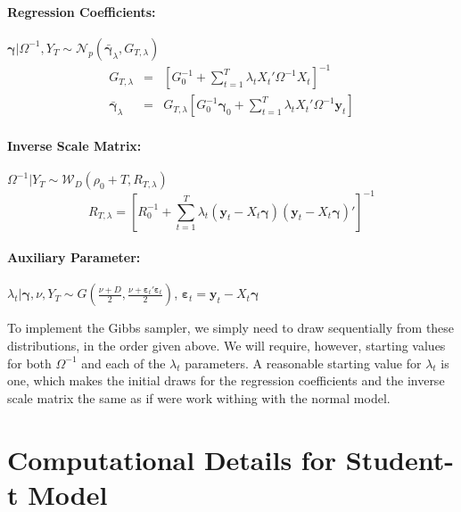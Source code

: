 \documentclass[12pt]{article}
\begin{document}
\paragraph{Regression Coefficients:} 
$\boldsymbol{\gamma}|\Omega^{-1},Y_T \sim \mathcal{N}_p\left( \bar{\boldsymbol{\gamma}}_{\lambda},G_{T,\lambda} \right)$
\begin{eqnarray*}
  G_{T,\lambda} &=& \left[ G_0^{-1} + \sum_{t=1}^T \lambda_t X_t' \Omega^{-1} X_t \right]^{-1}\\
  \bar{\boldsymbol{\gamma}}_{\lambda} &=& G_{T,\lambda} \left[ G_0^{-1}\boldsymbol{\gamma}_0 + \sum_{t=1}^{T}\lambda_t X_t'\Omega^{-1}\mathbf{y}_t \right]
\end{eqnarray*}
\paragraph{Inverse Scale Matrix:}
$\Omega^{-1}|Y_T \sim \mathcal{W}_D\left(\rho_0 + T, R_{T,\lambda}\right)$
\begin{equation*}
  R_{T,\lambda} = \left[ R_0^{-1} + \sum_{t=1}^{T} \lambda_t\left( \mathbf{y}_t - X_t \boldsymbol{\gamma} \right)\left( \mathbf{y}_t - X_t \boldsymbol{\gamma} \right)' \right]^{-1}
\end{equation*}

\paragraph{Auxiliary Parameter:} $\lambda_t|\boldsymbol{\gamma}, \nu, Y_T \sim G\left(\displaystyle \frac{\nu + D}{2}, \frac{\nu + \boldsymbol{\varepsilon}_t' \boldsymbol{\varepsilon}_t}{2} \right)$, $\boldsymbol{\varepsilon}_t = \mathbf{y}_t - X_t \boldsymbol{\gamma}$

To implement the Gibbs sampler, we simply need to draw sequentially from these distributions, in the order given above. 
We will require, however, starting values for both $\Omega^{-1}$ and each of the $\lambda_t$ parameters. 
A reasonable starting value for $\lambda_t$ is one, which makes the initial draws for the regression coefficients and the inverse scale matrix the same as if were work withing with the normal model.

\section{Computational Details for Student-t Model}
\end{document}
